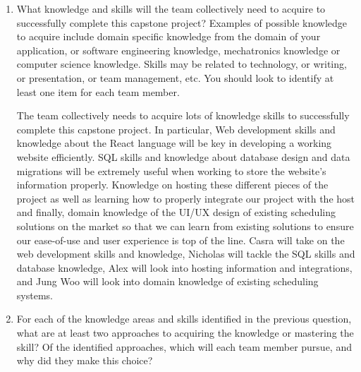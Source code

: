 \documentclass[12pt]{article}
\begin{document}
\begin{enumerate}
  \item What knowledge and skills will the team collectively need to acquire to
  successfully complete this capstone project?  Examples of possible knowledge
  to acquire include domain specific knowledge from the domain of your
  application, or software engineering knowledge, mechatronics knowledge or
  computer science knowledge.  Skills may be related to technology, or writing,
  or presentation, or team management, etc.  You should look to identify at
  least one item for each team member.

  The team collectively needs to acquire lots of knowledge skills to successfully 
  complete this capstone project. In particular, Web development skills and knowledge 
  about the React language  will be key in developing a working website efficiently. SQL 
  skills and knowledge about database design and data migrations will be extremely useful 
  when working to store the website’s information properly. Knowledge on hosting these 
  different pieces of the project as well as learning how to properly integrate our project 
  with the host and finally, domain knowledge of the UI/UX design of existing scheduling 
  solutions on the market so that we can learn from existing solutions to ensure our 
  ease-of-use and user experience is top of the line. Casra will take on the web development 
  skills and knowledge, Nicholas will tackle the SQL skills and database knowledge, 
  Alex will look into hosting information and integrations, and Jung Woo will look into 
  domain knowledge of existing scheduling systems.

  \item For each of the knowledge areas and skills identified in the previous
  question, what are at least two approaches to acquiring the knowledge or
  mastering the skill?  Of the identified approaches, which will each team
  member pursue, and why did they make this choice?


\end{enumerate}
\end{document}
